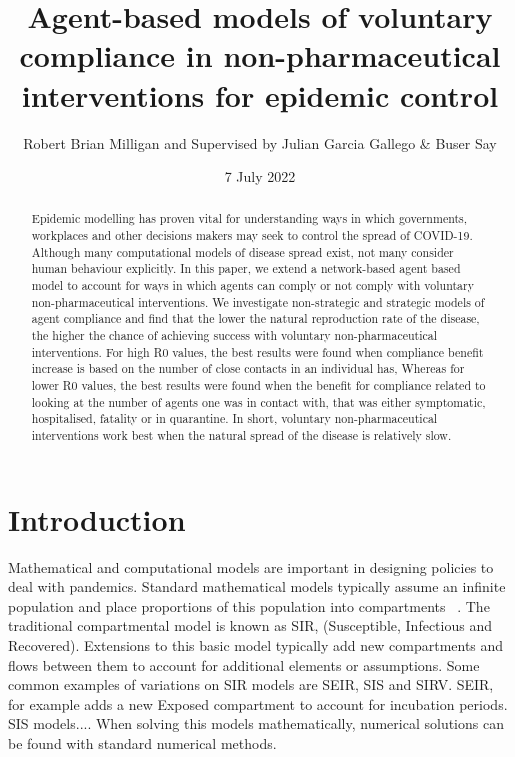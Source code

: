 \documentclass{article}
\title{Agent-based models of voluntary compliance in non-pharmaceutical interventions for epidemic control}
\author{Robert Brian Milligan and Supervised by Julian Garcia Gallego \& Buser Say}
\date{7 July 2022}
\begin{document}
\maketitle

\begin{abstract}
Epidemic modelling has proven vital for understanding ways in which governments, workplaces and other decisions makers may seek to control the spread of COVID-19. Although many computational models of disease spread exist, not many consider human behaviour explicitly. In this paper, we extend a network-based agent based model to account for ways in which agents can comply or not comply with voluntary non-pharmaceutical interventions. We investigate non-strategic and strategic models of agent compliance and find that the lower the natural reproduction rate of the disease, the higher the chance of achieving success with voluntary non-pharmaceutical interventions. For high R0 values, the best results were found when compliance benefit increase is based on the number of close contacts in an individual has, Whereas for lower R0 values, the best results were found when the benefit for compliance related to looking at the number of agents one was in contact with, that was either symptomatic, hospitalised, fatality or in quarantine. In short, voluntary non-pharmaceutical interventions work best when the natural spread of the disease is relatively slow.
\end{abstract}




\newpage 

\section{Introduction}

Mathematical and computational models are important in designing policies to deal with pandemics. 
Standard mathematical models typically assume an infinite population and place proportions of this population into compartments ~\cite{cooper_mondal_antonopoulos_2020}. 
The traditional compartmental model is known as SIR, (Susceptible, Infectious and Recovered). 
Extensions to this basic model typically add new compartments and flows between them to account for additional elements or assumptions. 
Some common examples of variations on SIR models are SEIR, SIS and SIRV. 
SEIR, for example adds a new Exposed compartment to account for incubation periods. 
SIS models....
When solving this models mathematically, numerical solutions can be found with standard numerical methods. 
\end{document}
